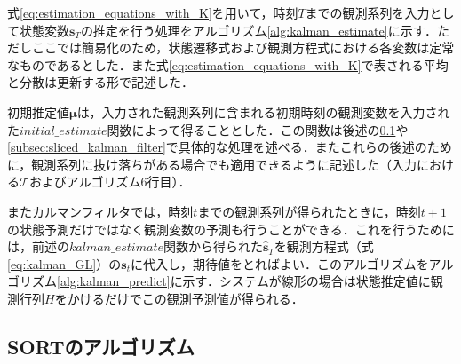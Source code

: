         式\ref{eq:estimation_equations_with_K}を用いて，時刻$T$までの観測系列を入力として状態変数$\bm{s}_T$の推定を行う処理をアルゴリズム\ref{alg:kalman_estimate}に示す．ただしここでは簡易化のため，状態遷移式および観測方程式における各変数は定常なものであるとした．また式\ref{eq:estimation_equations_with_K}で表される平均と分散は更新する形で記述した．
        
        初期推定値$\bm{\mu}$は，入力された観測系列に含まれる初期時刻の観測変数を入力された$initial\_estimate$関数によって得ることとした．この関数は後述の\ref{subsec:sort_algorithm}や\ref{subsec:sliced_kalman_filter}で具体的な処理を述べる．またこれらの後述のために，観測系列に抜け落ちがある場合でも適用できるように記述した（入力における$\mathcal{T}$およびアルゴリズム6行目）．

        またカルマンフィルタでは，時刻$t$までの観測系列が得られたときに，時刻$t+1$の状態予測だけではなく観測変数の予測も行うことができる．これを行うためには，前述の$kalman\_estimate$関数から得られた$\hat{\bm{s}}_T$を観測方程式（式\ref{eq:kalman_GL}）の$\bm{s}_t$に代入し，期待値をとればよい．このアルゴリズムをアルゴリズム\ref{alg:kalman_predict}に示す．システムが線形の場合は状態推定値に観測行列$H$をかけるだけでこの観測予測値が得られる．

    \subsection{SORTのアルゴリズム}
    \label{subsec:sort_algorithm}

